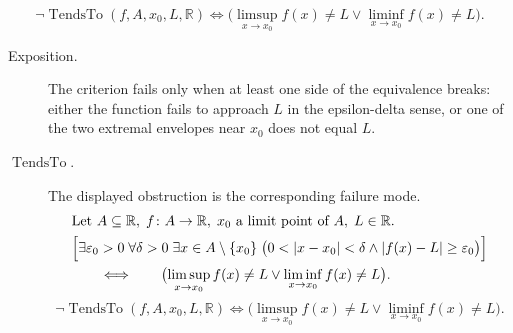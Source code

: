 \begin{remark*}
\[
\neg\operatorname{TendsTo}(f,A,x_0,L,\mathbb{R})
\Longleftrightarrow
\bigl(\limsup_{x\to x_0} f(x)\ne L \lor \liminf_{x\to x_0} f(x)\ne L\bigr).
\]
\end{remark*}

\begin{remark*}
\begin{description}
  \item[Exposition.]
The criterion fails only when at least one side of the equivalence breaks:
either the function fails to approach $L$ in the epsilon-delta sense, or
one of the two extremal envelopes near $x_0$ does not equal $L$.


  \item[\(\operatorname{TendsTo}.\)]
  The displayed obstruction is the corresponding failure mode.
  \[
\begin{aligned}
&\text{Let } A \subseteq \mathbb{R},\; f \colon A \to \mathbb{R},\; x_0 \text{ a limit point of } A,\; L \in \mathbb{R}.\\
&\Bigl[\exists \varepsilon_0>0\;\forall \delta>0\;\exists x\in A\setminus\{x_0\}\;
\bigl(0<|x-x_0|<\delta\land |f(x)-L|\ge\varepsilon_0\bigr)\Bigr]\\
&\qquad\Longleftrightarrow\qquad
\bigl(\limsup_{x\to x_0} f(x)\ne L \lor \liminf_{x\to x_0} f(x)\ne L\bigr).
\end{aligned}
  \]
  \[
\neg\operatorname{TendsTo}(f,A,x_0,L,\mathbb{R})
\Longleftrightarrow
\bigl(\limsup_{x\to x_0} f(x)\ne L \lor \liminf_{x\to x_0} f(x)\ne L\bigr).
  \]
\end{description}
\end{remark*}


